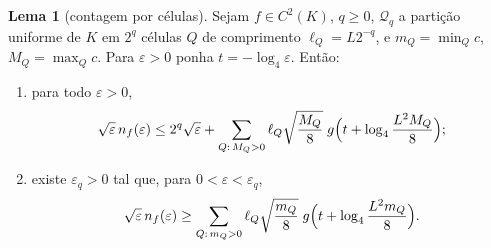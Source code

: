 \documentclass[12pt,a4paper]{article}
\theoremstyle{preciso}
\theoremstyle{definition}
\theoremstyle{preciso}
\theoremstyle{preciso}
\newtheorem{lemma}[teorema]{Lema}
\theoremstyle{preciso}
\theoremstyle{preciso}
\theoremstyle{definition}
\theoremstyle{preciso}
\theoremstyle{definition}
\theoremstyle{preciso}
\theoremstyle{preciso}
\theoremstyle{definition}
\begin{document}
\begin{lemma}[contagem por células]\label{map:artigo_2:12.6}
\label{artigo_2:lem:phase-cell-counts}
Sejam $f\in C^2(K)$, $q\ge0$, $\mathcal Q_q$ a partição uniforme de $K$ em
$2^q$ células $Q$ de comprimento $\ell_Q=L2^{-q}$, e
$m_Q=\min_Qc$, $M_Q=\max_Qc$. Para $\varepsilon>0$ ponha $t=-\log_4\varepsilon$.
Então:
\begin{enumerate}[label=(\alph*)]
\item para todo $\varepsilon>0$,
 \[
  \sqrt\varepsilon\,n_f(\varepsilon)\le2^q\sqrt\varepsilon
  +\sum_{Q:\,M_Q>0}\ell_Q\sqrt{\frac{M_Q}{8}}\;g\Bigl(t+\log_4\frac{L^2M_Q}{8}\Bigr);
 \]
\item existe $\varepsilon_q>0$ tal que, para $0<\varepsilon<\varepsilon_q$,
 \[
  \sqrt\varepsilon\,n_f(\varepsilon)\ge
  \sum_{Q:\,m_Q>0}\ell_Q\sqrt{\frac{m_Q}{8}}\;g\Bigl(t+\log_4\frac{L^2m_Q}{8}\Bigr).
 \]
\end{enumerate}
\end{lemma}
\end{document}

